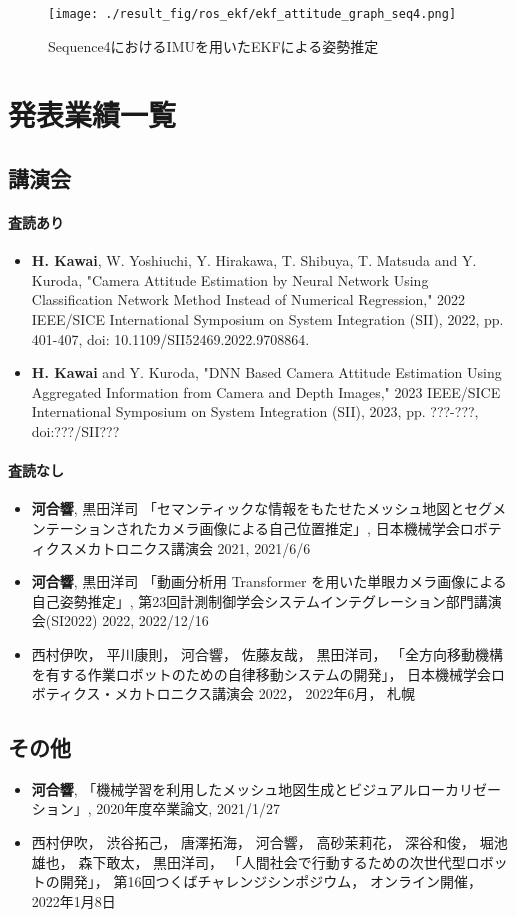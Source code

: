 \begin{figure}[thpb]
  \begin{minipage}[htpb]{1.0\hsize}
  \begin{center}
  \texttt{[image: ./result\_fig/ros\_ekf/ekf\_attitude\_graph\_seq4.png]}
  \caption{Sequence4におけるIMUを用いたEKFによる姿勢推定}
  \end{center}
  \end{minipage}
\end{figure}

\newpage
\chapter{発表業績一覧}
\section{講演会}
\subsubsection{査読あり}
\begin{itemize}
\item{\textbf{H. Kawai}, W. Yoshiuchi, Y. Hirakawa, T. Shibuya, T. Matsuda and Y. Kuroda, "Camera Attitude Estimation by Neural Network Using Classification Network Method Instead of Numerical Regression," 2022 IEEE/SICE International Symposium on System Integration (SII), 2022, pp. 401-407, doi: 10.1109/SII52469.2022.9708864.}
\item{\textbf{H. Kawai} and Y. Kuroda, "DNN Based Camera Attitude Estimation
Using Aggregated Information from Camera and Depth Images," 2023 IEEE/SICE International Symposium on System Integration (SII), 2023, pp. ???-???, doi:???/SII???}
\end{itemize}

\subsubsection{査読なし}
\begin{itemize}
\item{\textbf{河合響}, 黒田洋司 「セマンティックな情報をもたせたメッシュ地図とセグメンテーションされたカメラ画像による自己位置推定」, 日本機械学会ロボティクスメカトロニクス講演会 2021, 2021/6/6}
\item{\textbf{河合響}, 黒田洋司 「動画分析用 Transformer を用いた単眼カメラ画像による自己姿勢推定」, 第23回計測制御学会システムインテグレーション部門講演会(SI2022) 2022, 2022/12/16}
\item{西村伊吹， 平川康則， 河合響， 佐藤友哉， 黒田洋司， 「全方向移動機構を有する作業ロボットのための自律移動システムの開発」， 日本機械学会ロボティクス・メカトロニクス講演会 2022， 2022年6月， 札幌}
\end{itemize}

\section{その他}
\begin{itemize}
\item{\textbf{河合響}, 「機械学習を利用したメッシュ地図生成とビジュアルローカリゼーション」, 2020年度卒業論文, 2021/1/27}
\item{西村伊吹， 渋谷拓己， 唐澤拓海， 河合響， 高砂茉莉花， 深谷和俊， 堀池雄也， 森下敢太， 黒田洋司， 「人間社会で行動するための次世代型ロボットの開発」， 第16回つくばチャレンジシンポジウム， オンライン開催， 2022年1月8日}
\end{itemize}
